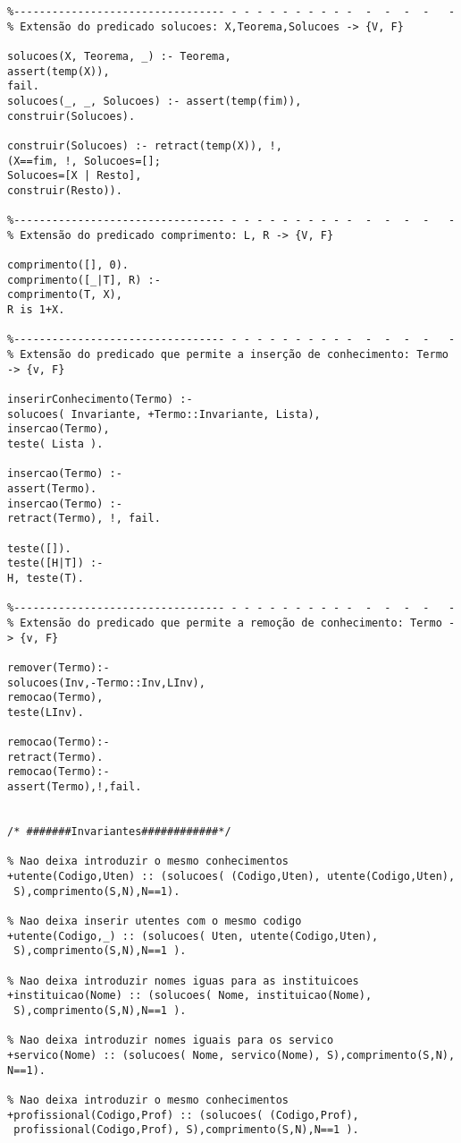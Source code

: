 \documentclass[pdftex,12pt,a4paper]{report}
\begin{document}
\begin{appendices}
\begin{Verbatim}
%--------------------------------- - - - - - - - - - -  -  -  -  -   -
% Extensão do predicado solucoes: X,Teorema,Solucoes -> {V, F}

solucoes(X, Teorema, _) :- Teorema, 
assert(temp(X)), 
fail. 
solucoes(_, _, Solucoes) :- assert(temp(fim)), 
construir(Solucoes).

construir(Solucoes) :- retract(temp(X)), !,
(X==fim, !, Solucoes=[];
Solucoes=[X | Resto], 
construir(Resto)).

%--------------------------------- - - - - - - - - - -  -  -  -  -   -
% Extensão do predicado comprimento: L, R -> {V, F}

comprimento([], 0).
comprimento([_|T], R) :-
comprimento(T, X),
R is 1+X.

%--------------------------------- - - - - - - - - - -  -  -  -  -   -
% Extensão do predicado que permite a inserção de conhecimento: Termo -> {v, F}

inserirConhecimento(Termo) :-
solucoes( Invariante, +Termo::Invariante, Lista),
insercao(Termo),
teste( Lista ).

insercao(Termo) :-
assert(Termo).
insercao(Termo)	:-
retract(Termo), !, fail.

teste([]).
teste([H|T]) :-
H, teste(T).	

%--------------------------------- - - - - - - - - - -  -  -  -  -   -
% Extensão do predicado que permite a remoção de conhecimento: Termo -> {v, F}

remover(Termo):-
solucoes(Inv,-Termo::Inv,LInv),
remocao(Termo),
teste(LInv).

remocao(Termo):-
retract(Termo).
remocao(Termo):-
assert(Termo),!,fail.


/* #######Invariantes############*/

% Nao deixa introduzir o mesmo conhecimentos
+utente(Codigo,Uten) :: (solucoes( (Codigo,Uten), utente(Codigo,Uten),
 S),comprimento(S,N),N==1).

% Nao deixa inserir utentes com o mesmo codigo
+utente(Codigo,_) :: (solucoes( Uten, utente(Codigo,Uten),
 S),comprimento(S,N),N==1 ).

% Nao deixa introduzir nomes iguas para as instituicoes
+instituicao(Nome) :: (solucoes( Nome, instituicao(Nome),
 S),comprimento(S,N),N==1 ). 

% Nao deixa introduzir nomes iguais para os servico
+servico(Nome) :: (solucoes( Nome, servico(Nome), S),comprimento(S,N),
N==1). 

% Nao deixa introduzir o mesmo conhecimentos
+profissional(Codigo,Prof) :: (solucoes( (Codigo,Prof),
 profissional(Codigo,Prof), S),comprimento(S,N),N==1 ).


\end{Verbatim}
\end{appendices}
\end{document}
